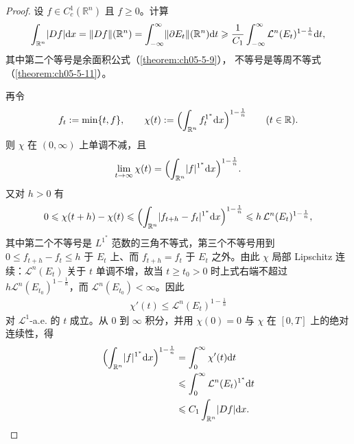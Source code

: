 ﻿\documentclass[../../main.tex]{subfiles}%
\begin{document}
\begin{proof}
设 $f\in C_c^1(\mathbb{R}^n)$ 且 $f\geqslant0$。计算
\begin{align*}
\int_{\mathbb{R}^n}\lvert Df\rvert\mathrm{d} x=\lVert Df\rVert(\mathbb{R}^n)=\int_{-\infty}^{\infty}\lVert\partial E_t\rVert(\mathbb{R}^n)\mathrm{d} t\geqslant\frac{1}{C_1}\int_{-\infty}^{\infty}\mathcal{L}^n(E_t)^{1-\frac1n}\mathrm{d} t,
\end{align*}
其中第二个等号是余面积公式（\cref{theorem:ch05-5-9}），%
不等号是等周不等式（\cref{theorem:ch05-5-11}）。%

再令
\begin{align*}
f_t:=\min\{t,f\},\qquad \chi(t):=\Bigl(\int_{\mathbb{R}^n}f_t^{1^*}\mathrm{d} x\Bigr)^{1-\frac1n}\qquad(t\in\mathbb{R}).
\end{align*}
则 $\chi$ 在 $(0,\infty)$ 上单调不减，且
\begin{align*}
\lim_{t\to\infty}\chi(t)=\Bigl(\int_{\mathbb{R}^n}\lvert f\rvert^{1^*}\mathrm{d} x\Bigr)^{1-\frac1n}.
\end{align*}
又对 $h>0$ 有
\begin{align*}
0\leqslant\chi(t+h)-\chi(t)\leqslant\Bigl(\int_{\mathbb{R}^n}\lvert f_{t+h}-f_t\rvert^{1^*}\mathrm{d} x\Bigr)^{1-\frac1n}\leqslant h\,\mathcal{L}^n(E_t)^{1-\frac1n},
\end{align*}
其中第二个不等号是 $L^{1^*}$ 范数的三角不等式，第三个不等号用到 $0\leqslant f_{t+h}-f_t\leqslant h$ 于 $E_t$ 上、而 $f_{t+h}=f_t$ 于 $E_t$ 之外。由此 $\chi$ 局部 Lipschitz 连续：$\mathcal{L}^n(E_t)$ 关于 $t$ 单调不增，故当 $t\geqslant t_0>0$ 时上式右端不超过 $h\mathcal{L}^n(E_{t_0})^{1-\frac1n}$，而 $\mathcal{L}^n(E_{t_0})<\infty$。因此
\begin{align*}
\chi'(t)\leqslant\mathcal{L}^n(E_t)^{1-\frac1n}
\end{align*}
对 $\mathcal{L}^1$-a.e. 的 $t$ 成立。从 $0$ 到 $\infty$ 积分，并用 $\chi(0)=0$ 与 $\chi$ 在 $[0,T]$ 上的绝对连续性，得
\begin{align*}
\Bigl(\int_{\mathbb{R}^n}\lvert f\rvert^{1^*}\mathrm{d} x\Bigr)^{1-\frac1n}
&=\int_0^{\infty}\chi'(t)\mathrm{d} t\\
&\leqslant\int_0^{\infty}\mathcal{L}^n(E_t)^{1^*}\mathrm{d} t\\
&\leqslant C_1\int_{\mathbb{R}^n}\lvert Df\rvert\mathrm{d} x .
\end{align*}
\end{proof}
\end{document}
